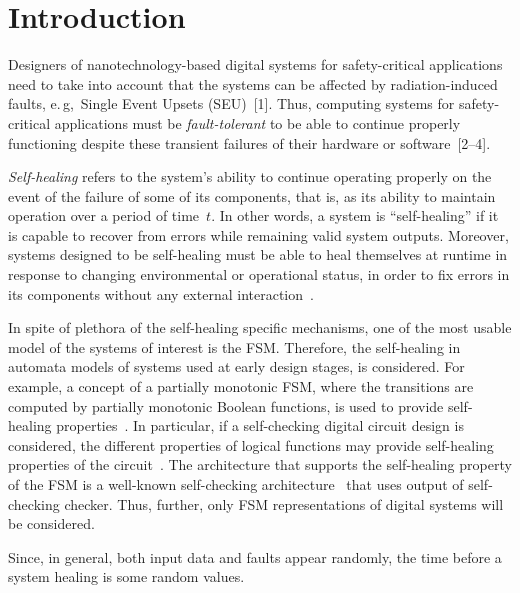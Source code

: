 
      \thispagestyle{headings}

      \begin{multicols}{2}

      \label{st\stat}



\section{Introduction}

\noindent
Designers of nanotechnology-based digital systems
for safety-critical applications need to take into
account that the systems can be affected by radiation-induced
faults, e.\,g,\ Single Event Upsets
(SEU)~[1].
Thus, computing systems for safety-critical
applications must be \textit{fault-tolerant} to be able to
continue properly functioning despite these transient
failures of their hardware or software~[2--4].

{\it Self-healing} refers to the system's ability to continue
operating properly on the event of the failure of some of its
components, that is, as its ability to maintain operation over a
period of time~$t$. In other words, a system is ``self-healing'' if
it is capable to recover from errors while remaining valid
system outputs. Moreover, systems designed to be self-healing must be
able to heal themselves at runtime in response to changing
environmental or operational status, in order to fix errors
in its components without any external interaction~\cite{4fr}.

In spite of plethora of the self-healing specific mechanisms, one
of the most usable model of the systems of interest is the FSM.
Therefore,  the self-healing in automata models of
systems used at early design stages, is considered. For example, a concept of
a partially monotonic FSM, where the transitions are computed by
partially monotonic Boolean functions, is used to provide
self-healing properties~\cite{6fr}. In particular, if  a
self-checking digital circuit design is considered, the different properties of
logical functions may provide self-healing properties of the
circuit~\cite{6fr}. The architecture that supports the self-healing
property of the FSM is a well-known self-checking architecture~\cite{6fr} that uses output of self-checking checker.
Thus, further,  only FSM representations of digital
systems will be considered.

Since, in general, both input data and faults appear
randomly, the time before a system healing is some
random values.


\end{multicols}
